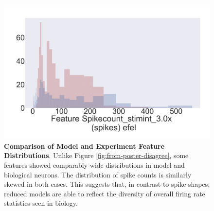 \begin{figure}
    \centering
    \includegraphics[scale=0.75]{figures/spike_count_at_3rheobase.png}
    \caption[Comparison of Model and Experiment Feature Distributions (A)]{\textbf{Comparison of Model and Experiment Feature Distributions}.
    Unlike Figure \ref{fig:from-poster-disagree}, some features showed comparably wide distributions in model and biological neurons.
    The distribution of spike counts is similarly skewed in both cases.
    This suggests that, in contrast to spike shapes, reduced models are able to reflect the diversity of overall firing rate statistics seen in biology.
    }
    \label{fig:from_poster_disagree}
\end{figure}


